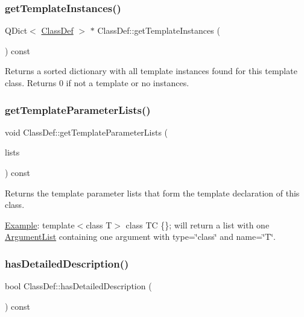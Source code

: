 \subsubsection{\texorpdfstring{getTemplateInstances()}{getTemplateInstances()}}
{\footnotesize\ttfamily Q\+Dict$<$ \mbox{\hyperlink{class_class_def}{Class\+Def}} $>$ $\ast$ Class\+Def\+::get\+Template\+Instances (\begin{DoxyParamCaption}{ }\end{DoxyParamCaption}) const}

Returns a sorted dictionary with all template instances found for this template class. Returns 0 if not a template or no instances. \mbox{\label{class_class_def_ac207abeb9986e58ea9ec4362125e0de2}} 
\subsubsection{\texorpdfstring{getTemplateParameterLists()}{getTemplateParameterLists()}}
{\footnotesize\ttfamily void Class\+Def\+::get\+Template\+Parameter\+Lists (\begin{DoxyParamCaption}\item[{\mbox{\hyperlink{class_q_list}{Q\+List}}$<$ \mbox{\hyperlink{class_argument_list}{Argument\+List}} $>$ \&}]{lists }\end{DoxyParamCaption}) const}

Returns the template parameter lists that form the template declaration of this class.

\mbox{\hyperlink{struct_example}{Example}}\+: {\ttfamily template$<$class T$>$ class TC \{\};} will return a list with one \mbox{\hyperlink{class_argument_list}{Argument\+List}} containing one argument with type=\char`\"{}class\char`\"{} and name=\char`\"{}\+T\char`\"{}. \mbox{\label{class_class_def_ae82303a3ca4f00eafe79322a56263887}} 
\subsubsection{\texorpdfstring{hasDetailedDescription()}{hasDetailedDescription()}}
{\footnotesize\ttfamily bool Class\+Def\+::has\+Detailed\+Description (\begin{DoxyParamCaption}{ }\end{DoxyParamCaption}) const}

